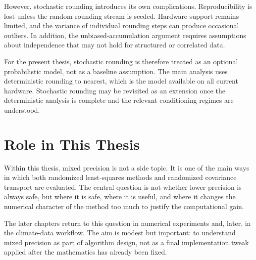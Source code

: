 However, stochastic rounding introduces its own complications. Reproducibility is
lost unless the random rounding stream is seeded. Hardware support remains
limited, and the variance of individual rounding steps can produce occasional
outliers. In addition, the unbiased-accumulation argument requires assumptions
about independence that may not hold for structured or correlated data.

For the present thesis, stochastic rounding is therefore treated as an optional
probabilistic model, not as a baseline assumption. The main analysis uses
deterministic rounding to nearest, which is the model available on all current
hardware. Stochastic rounding may be revisited as an extension once the
deterministic analysis is complete and the relevant conditioning regimes are
understood.

\section{Role in This Thesis}

Within this thesis, mixed precision is not a side topic. It is one of the main ways
in which both randomized least-squares methods and randomized covariance
transport are evaluated. The central question is not whether lower precision is
always safe, but where it is safe, where it is useful, and where it changes the
numerical character of the method too much to justify the computational gain.

The later chapters return to this question in numerical experiments and, later, in
the climate-data workflow. The aim is modest but important: to understand mixed
precision as part of algorithm design, not as a final implementation tweak applied
after the mathematics has already been fixed.
